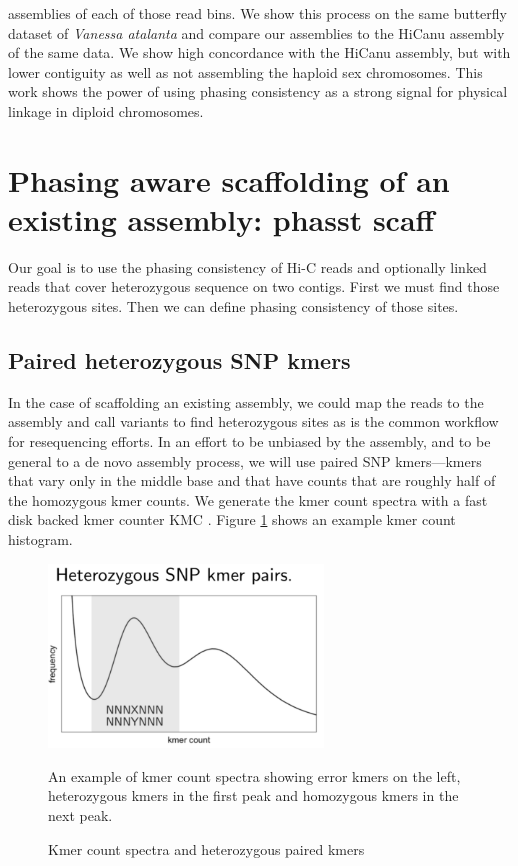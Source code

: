{assemblies of each of those read bins. We show this process on the same butterfly dataset of \textit{Vanessa atalanta} and compare our assemblies to the HiCanu assembly of the same data. We show high concordance with the HiCanu assembly, but with lower contiguity as well as not assembling the haploid sex chromosomes. This work shows the power of using phasing consistency as a strong signal for physical linkage in diploid chromosomes.
}


\section{Phasing aware scaffolding of an existing assembly: phasst scaff}

\par{
Our goal is to use the phasing consistency of Hi-C reads and optionally linked reads that cover heterozygous sequence on two contigs. First we must find those heterozygous sites. Then we can define phasing consistency of those sites.
}


\subsection{Paired heterozygous SNP kmers}
\par{
In the case of scaffolding an existing assembly, we could map the reads to the assembly and call variants to find heterozygous sites as is the common workflow for resequencing efforts. In an effort to be unbiased by the 
assembly, and to be general to a de novo assembly process, we will use paired SNP kmers---kmers that vary only in the middle base and that have counts that are roughly half of the homozygous kmer counts. We generate the 
kmer count spectra with a fast disk backed kmer counter KMC \cite{kmc}\cite{kmc2}\cite{kmc3}. Figure \ref{figure:kmc} shows an example kmer count histogram. 
}

\begin{figure}[htbp!]

\caption{Kmer count spectra and heterozygous paired kmers}
\label{figure:kmc}
\begin{centering}
\includegraphics[width=0.65\textwidth]{kmc.png}
\par{An example of kmer count spectra showing error kmers on the left, heterozygous kmers in the first peak and homozygous kmers in the next peak.}
\end{centering}
\end{figure}

